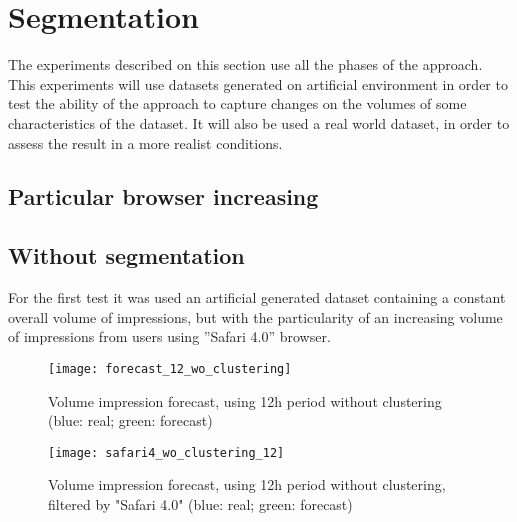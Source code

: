 \section{Segmentation}

The experiments described on this section use all the phases of the approach.
This experiments will use datasets generated on artificial environment in order to
test the ability of the approach to capture changes on the volumes of some
characteristics of the dataset.
It will also be used a real world dataset, in order to assess the result in a
more realist conditions.

\subsection{Particular browser increasing}

\subsection*{Without segmentation}

For the first test it was used an artificial generated dataset containing a constant overall
volume of impressions, but with the particularity of an increasing volume of
impressions from users using ''Safari 4.0'' browser. 

\begin{figure}[!ht]
\centering
\begin{minipage}[t]{0.45\linewidth}
\texttt{[image: forecast\_12\_wo\_clustering]} \caption[Volume
impression forecast, safari]{Volume impression
forecast, using 12h period without clustering (blue: real; green: forecast)}
\label{fig:vol_safari_12h_wo_clustering}
\end{minipage}
\quad
\begin{minipage}[t]{0.45\linewidth}
\texttt{[image: safari4\_wo\_clustering\_12]} \caption[Volume
impression forecast, safari 4]{Volume impression
forecast, using 12h period without clustering, filtered by "Safari 4.0" (blue: real; green: forecast)}
\label{fig:vol_safari_12h_wo_clustering_safari_4} 
\end{minipage}
\end{figure}



